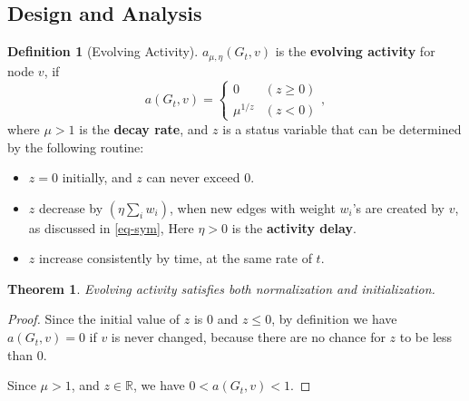 \documentclass[12pt,abstract=true]{scrartcl}
\numberwithin{equation}{section}
\theoremstyle{definition}   \newtheorem{definition}{Definition}[section]
\theoremstyle{plain}        \newtheorem{theorem}{Theorem}[section]
\theoremstyle{plain}        \newtheorem{observation}{Observation}[section]
\theoremstyle{plain}        \newtheorem{fact}{Fact}[section]
\theoremstyle{plain}        \newtheorem{claim}{Claim}[section]
\theoremstyle{plain}        \newtheorem{lemma}[theorem]{Lemma}
\theoremstyle{plain}        \newtheorem{corollary}[theorem]{Corollary}
\theoremstyle{remark}       \newtheorem{example}{Example}[section]
\theoremstyle{remark}       \newtheorem{remark}{Remark}[section]
\begin{document}
\subsection{Design and Analysis}

\begin{definition}[Evolving Activity]
$a_{\mu,\eta}(G_t,v)$ is the \textbf{evolving activity} for node $v$, if
\begin{equation}
a(G_t,v)=\begin{cases}
0& (z\geq 0)\\
\mu^{1/z} & (z<0)
\end{cases},
\end{equation}
where $\mu>1$ is the \textbf{decay rate}, and $z$ is a status variable that can
be determined by the following routine:
\begin{itemize}
\item $z=0$ initially, and $z$ can never exceed $0$.
\item $z$ decrease by $\left(\eta\sum_i w_i\right)$, when new edges with weight
$w_i$'s are created by $v$, as discussed in \eqref{eq-sym}, Here $\eta>0$ is the
\textbf{activity delay}.
\item $z$ increase consistently by time, at the same rate of $t$.
\end{itemize}
\end{definition}

\begin{center}  
\end{center}

\begin{theorem}
Evolving activity satisfies both normalization and initialization.
\end{theorem}
\begin{proof}
Since the initial value of $z$ is $0$ and $z\leq 0$, by definition we have
$a(G_t,v)=0$ if $v$ is never changed, because there are no chance for $z$
to be less than $0$.

Since $\mu>1$, and $z\in\mathbb{R}$, we have $0<a(G_t,v)<1$.
\end{proof}
\end{document}
